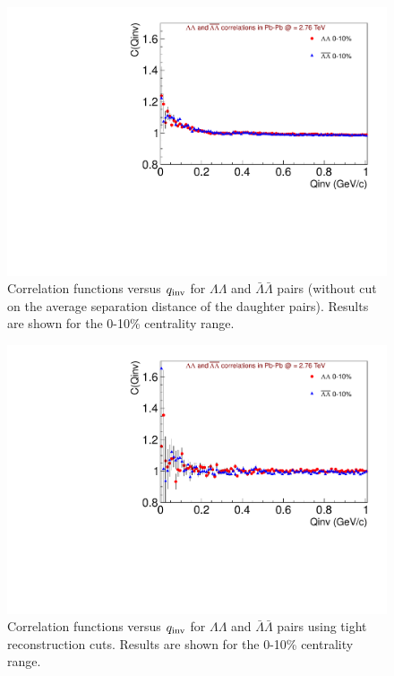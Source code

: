 {\begin{figure}[hbtp]
\includegraphics[scale=0.7]{CFs_noMergeCut_note.pdf}
\caption[Correlation functions versus $q_{\rm inv}$ for $\Lambda\Lambda$ and $\bar{\Lambda}\bar{\Lambda}$ pairs. No merging cuts]{Correlation functions versus $q_{\rm inv}$ for $\Lambda\Lambda$ and $\bar{\Lambda}\bar{\Lambda}$ pairs (without cut on the average separation distance of the daughter pairs).  Results are shown for the 0-10\% centrality range.}
\label{fig:CFNoMerge}
\end{figure}

\begin{figure}[hbtp]
\includegraphics[scale=0.7]{CFs_tightcut_note.pdf}
\caption[Correlation functions versus $q_{\rm inv}$ for $\Lambda\Lambda$ and $\bar{\Lambda}\bar{\Lambda}$ pairs.  Tight cuts]{Correlation functions versus $q_{\rm inv}$ for $\Lambda\Lambda$ and $\bar{\Lambda}\bar{\Lambda}$ pairs using tight reconstruction cuts.  Results are shown for the 0-10\% centrality range.}
\label{fig:CFTightCuts}
\end{figure}

}
